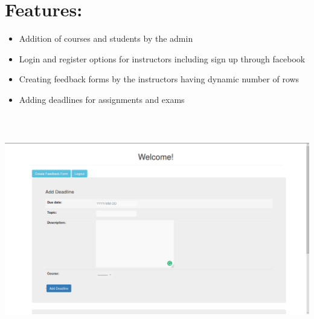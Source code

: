 \documentclass{article}
\begin{document}
\section{Features:}
\begin{itemize}
\item Addition of courses and students by the admin
\item Login and register options for instructors including sign up through facebook
\item Creating feedback forms by the instructors having dynamic number of rows
\item Adding deadlines for assignments and exams
\end{itemize}
\hfill \break
\includegraphics[width=15cm, height=10cm]{photos/deadline.png}
\newpage
\end{document}
